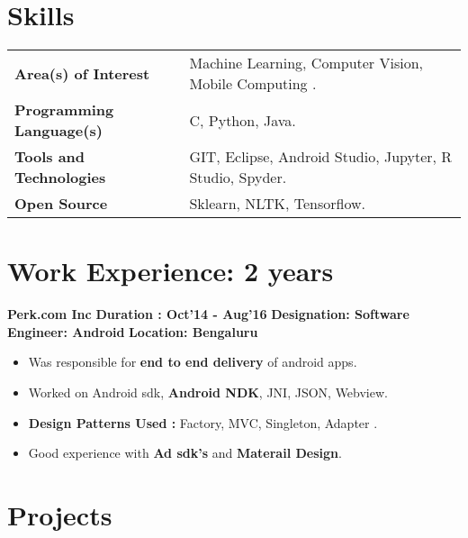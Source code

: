 \documentclass{article}
\begin{document}
\vspace*{.1cm}
\section{Skills}
\begin{tabular}{ll}
	\textbf{Area(s) of Interest} & Machine Learning, Computer Vision, Mobile Computing .\\
	\textbf{Programming Language(s)}&C, Python, Java. \\
	\textbf{Tools and Technologies} & GIT, Eclipse, Android Studio, Jupyter, R Studio, Spyder. \\
	\textbf{Open Source} & Sklearn, NLTK, Tensorflow.\\
\end{tabular}





\section{Work Experience: 2 years}

\textbf{\large{Perk.com Inc}} \hspace*{11.8cm}
\textbf{Duration : Oct'14 - Aug'16 }  \textbf{Designation: Software Engineer: Android}\hspace*{7.3cm}
\textbf{Location: Bengaluru} 

\vspace*{.051mm}
\begin{itemize}[noitemsep]
	 \item Was responsible for \textbf{end to end delivery} of android apps.
	 \item Worked on Android sdk, \textbf{Android NDK}, JNI, JSON, Webview.
	\item \textbf{Design Patterns Used :} Factory, MVC, Singleton, Adapter .
	\item Good experience with \textbf{Ad sdk's} and \textbf{Materail Design}.
\end{itemize}


\vspace*{.3cm}

\section{Projects}
\end{document}
